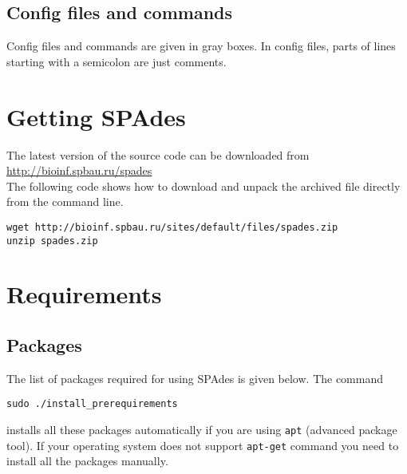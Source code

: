 \documentclass{article}
\def\spades{SPAdes}
\begin{document}
\subsection{Config files and commands}
Config files and commands are given in gray boxes. 
In config files, parts of lines starting with a semicolon are just comments.


\section{Getting {\spades}}
The latest version of the source code can be downloaded from\\
\url{http://bioinf.spbau.ru/spades}\\
The following code shows how to download and unpack the archived file
directly from the command line.

\begin{lstlisting}
wget http://bioinf.spbau.ru/sites/default/files/spades.zip
unzip spades.zip
\end{lstlisting}

\section{Requirements}\label{section:requirements}
\subsection{Packages}\label{subsection:packages}
The list of packages required for using {\spades} is given below.
The command
\begin{lstlisting}
sudo ./install_prerequirements
\end{lstlisting}
installs all these packages automatically if you are using {\tt apt} (advanced package tool).
If your operating system does not support {\tt apt-get} command you
need to install all the packages manually. 
\end{document}
